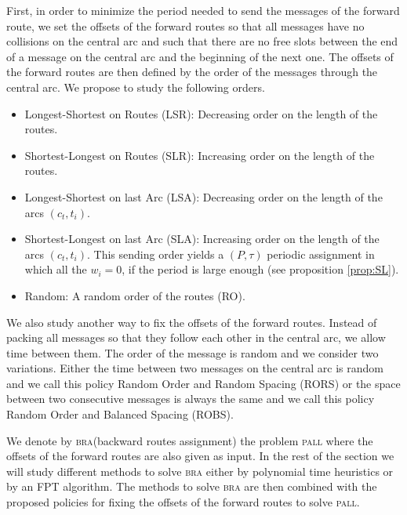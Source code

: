 \documentclass[10pt, conference, letterpaper]{IEEEtran}
\newcommand{\todo}[1]{{\color{red} TODO: {#1}}}
\newcommand\pall{\textsc{pall}\xspace}
\newcommand\bra{\textsc{bra}\xspace}
\begin{document}
     First, in order to minimize the period needed to send the messages of the forward route, we set the offsets of the forward routes so that all messages have no collisions on the central arc and such that there are no free slots between the end of a message on the central arc and the beginning of the next one.
     The offsets of the forward routes are then defined by the order of the messages through the central arc. We propose to study the following orders. 
	\begin{itemize}
	 
	 \item Longest-Shortest on Routes (LSR): Decreasing order on the length of the routes.
	 \item Shortest-Longest on Routes (SLR): Increasing order on the length of the routes. 
	 \item Longest-Shortest on last Arc (LSA): Decreasing order on the length of the arcs $(c_t,t_i)$.
	 \item Shortest-Longest on last Arc (SLA): Increasing order on the length of the arcs $(c_t,t_i)$. This sending order yields a $(P,\tau)$ periodic assignment in which all the $w_i = 0$, if the period is large enough (see proposition \ref{prop:SL}).
	 \item Random: A random order of the routes (RO).
	\end{itemize}

    We also study another way to fix the offsets of the forward routes. Instead of packing all messages so that they follow each other
    in the central arc, we allow time between them. The order of the message is random and we consider two variations. 
    Either the time between two messages on the central arc is random and we call this policy Random Order and Random Spacing (RORS) or the space between two consecutive messages is always the same and we call this policy Random Order and Balanced Spacing (ROBS).
 	
    We denote by \bra (backward routes assignment) the problem \pall where the offsets of the forward routes are also given as input.
    In the rest of the section we will study different methods to solve \bra either by polynomial time heuristics or by an FPT algorithm. The methods to solve \bra are then combined with the proposed policies for fixing the offsets of the forward routes
    to solve \pall.  
   
\end{document}
